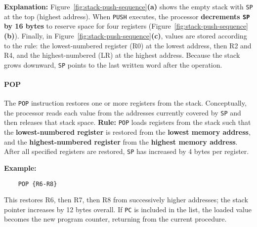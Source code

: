 \noindent\textbf{Explanation:}
Figure~\ref{fig:stack-push-sequence}\textbf{(a)} shows the empty stack with \texttt{SP} at the top (highest address).
When \texttt{PUSH} executes, the processor \textbf{decrements \texttt{SP} by 16 bytes} to reserve space for four registers (Figure~\ref{fig:stack-push-sequence}\textbf{(b)}).
Finally, in Figure~\ref{fig:stack-push-sequence}\textbf{(c)}, values are stored according to the rule: the lowest-numbered register (R0) at the lowest address, then R2 and R4, and the highest-numbered (LR) at the highest address.
Because the stack grows downward, \texttt{SP} points to the last written word after the operation.

\bigskip
\paragraph{POP}

The \texttt{POP} instruction restores one or more registers from the stack.
Conceptually, the processor reads each value from the addresses currently covered by \texttt{SP} and then releases that stack space.
\textbf{Rule:} \texttt{POP} loads registers from the stack such that the \textbf{lowest-numbered register} is restored from the \textbf{lowest memory address}, and the \textbf{highest-numbered register} from the \textbf{highest memory address}.
After all specified registers are restored, \texttt{SP} has increased by 4 bytes per register.

\medskip
\noindent
\textbf{Example:}
\begin{lstlisting}
    POP {R6-R8}
\end{lstlisting}

This restores R6, then R7, then R8 from successively higher addresses; the stack pointer increases by 12 bytes overall.
If \texttt{PC} is included in the list, the loaded value becomes the new program counter, returning from the current procedure.

